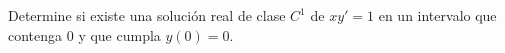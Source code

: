 Determine si existe una solución real de clase $C^1$ de $xy'=1$ en un intervalo que contenga $0$ y que cumpla $y(0)=0$.
